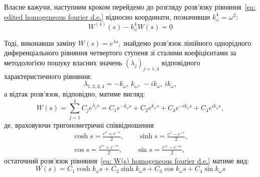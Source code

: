 Власне кажучи, наступним кроком перейдемо до розгляду розв'язку рівняння~\eqref{eq: edited homogeneous fourier d.e.} відносно координати, позначивши $k_{\omega}^4=\omega^2:$
\begin{equation}\label{eq: W(s) homogeneous fourier d.e.}
    W^{(4)}(s) - k_{\omega}^4 W(s) = 0
\end{equation}

\newpage
Тоді, виконавши заміну $W(s)=e^{\lambda s}$, знайдемо розв'язок лінійного однорідного диференціального рівняння четвертого ступеня зі сталими коефіцієнтами за методологією пошуку власних значень $\left( \lambda_j \right)_{j=\overline{1,4}}$ відповідного характеристичного рівняння:
\begin{equation}\label{eq: eigenvalues}
    \lambda_{1,2,3,4} = -k_{\omega},\, k_{\omega},\, -ik_{\omega},\, ik_{\omega},
\end{equation} 
а відтак розв'язок, відповідно, матиме вигляд:
\begin{equation}\label{eq: solution of homogeneous d.e.}
    W(s) = \sum\limits_{j=1}^{4} C_j e^{\lambda_j s} = C_1e^{-k_{\omega} s} + C_2e^{k_{\omega} s} + C_3e^{-ik_{\omega} s} + C_4e^{ik_{\omega} s},
\end{equation} 
де, враховуючи тригонометричні співвідношення
\begin{align}\label{eq: trigonometric ratios}
    \cosh{s} = \frac{e^{s}+e^{-s}}{2}, \qquad \sinh{s} = \frac{e^{s}-e^{-s}}{2}, \\
    \cos{s} = \frac{e^{is}+e^{-is}}{2}, \qquad \sin{s} = \frac{e^{is}-e^{-is}}{2},
\end{align}
остаточний розв'язок рівняння~\eqref{eq: W(s) homogeneous fourier d.e.} матиме вид:
\begin{equation}\label{eq: final solution of homogeneous d.e.}
    W(s) = C_1\cosh{k_{\omega} s} + C_2\sinh{k_{\omega} s} + C_3\cos{k_{\omega} s} + C_4\sin{k_{\omega} s}
\end{equation}

